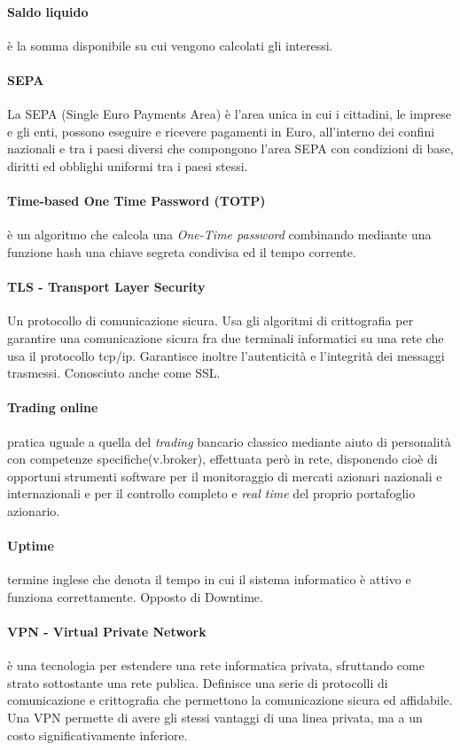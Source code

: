 \paragraph{Saldo liquido} \label{glossario:saldo-liquido}
	\`e la somma disponibile su cui vengono calcolati gli interessi.
\paragraph{SEPA} \label{glossario:sepa}
	La SEPA (Single Euro Payments Area) è l’area unica in cui i cittadini, le imprese e gli enti, possono eseguire e ricevere pagamenti in Euro, all’interno dei confini nazionali e tra i paesi diversi che compongono l’area SEPA con condizioni di base, diritti ed obblighi uniformi tra i paesi stessi. 
\paragraph{Time-based One Time Password (TOTP)}
	è un algoritmo che calcola una \emph{One-Time password} combinando mediante una funzione hash una chiave segreta condivisa ed il tempo corrente. \cite{totprfc}
\paragraph{TLS - Transport Layer Security}
Un protocollo di comunicazione sicura. Usa gli algoritmi di crittografia per garantire una comunicazione sicura fra due terminali informatici su una rete che usa il protocollo tcp/ip.
Garantisce inoltre l'autenticit\`a e l'integrit\`a dei messaggi trasmessi.
Conosciuto anche come SSL.
\paragraph{Trading online}
	pratica uguale a quella del \emph{trading} bancario classico mediante aiuto di personalità con competenze specifiche(v.broker), effettuata però in rete, disponendo cioè di opportuni strumenti software per il monitoraggio di mercati azionari nazionali e internazionali e  per il controllo completo e \emph{real time} del proprio portafoglio azionario.
\paragraph{Uptime}
    termine inglese che denota il tempo in cui il sistema informatico \`e attivo e funziona correttamente.
    Opposto di Downtime.


\paragraph{VPN - Virtual Private Network}
        \`e una tecnologia per estendere una rete informatica privata, sfruttando come strato sottostante una rete publica.
    Definisce una serie di protocolli di comunicazione e crittografia che permettono la comunicazione sicura ed affidabile.
    Una VPN permette di avere gli stessi vantaggi di una linea privata, ma a un costo significativamente inferiore.
